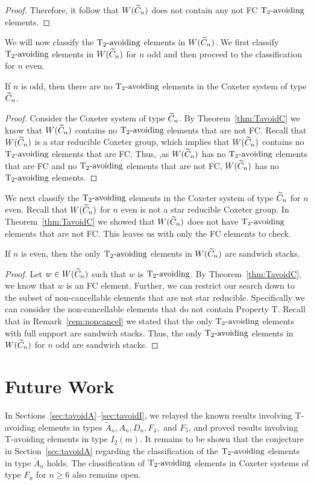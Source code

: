 \begin{theorem}
\begin{proof}
	Therefore, it follow that $W(\widetilde{C}_n)$ does not contain any not FC $\operatorname{T_2-\mathrm{avoiding}}$ elements. 
\end{proof}
\end{theorem}

We will now classify the $\operatorname{T_2-\mathrm{avoiding}}$ elements in $W(\widetilde{C}_n)$. We first classify $\operatorname{T_2-\mathrm{avoiding}}$ elements in $W(\widetilde{C}_n)$ for $n$ odd and then proceed to the classification for $n$ even.

\begin{theorem}
	If $n$ is odd, then there are no $\operatorname{T_2-\mathrm{avoiding}}$ elements in the Coxeter system of type $\widetilde{C}_n$.
	\begin{proof}
		Consider the Coxeter system of type $\widetilde{C}_n$. By Theorem~\ref{thm:TavoidC} we know that $W(\widetilde{C}_n)$ contains no $\operatorname{T_2-\mathrm{avoiding}}$ elements that are not FC. Recall that $W(\widetilde{C}_n)$ is a star reducible Coxeter group, which implies that $W(\widetilde{C}_n)$ contains no $\operatorname{T_2-\mathrm{avoiding}}$ elements that are FC. Thus, ,as $W(\widetilde{C}_n)$ has no $\operatorname{T_2-\mathrm{avoiding}}$ elements that are FC and no $\operatorname{T_2-\mathrm{avoiding}}$ elements that are not FC, $W(\widetilde{C}_n)$ has no $\operatorname{T_2-\mathrm{avoiding}}$ elements.
	\end{proof}
\end{theorem}

We next classify the $\operatorname{T_2-\mathrm{avoiding}}$ elements in the Coxeter system of type $\widetilde{C}_n$ for $n$ even. Recall that $W(\widetilde{C}_n)$ for $n$ even is not a star reducible Coxeter group. In Theorem~\ref{thm:TavoidC} we showed that $W(\widetilde{C}_n)$ does not have $\operatorname{T_2-\mathrm{avoiding}}$ elements that are not FC. This leaves us with only the FC elements to check.

\begin{theorem}
	If $n$ is even, then the only $\operatorname{T_2-\mathrm{avoiding}}$ elements in $W(\widetilde{C}_n)$ are sandwich stacks.
	\begin{proof}
		Let $w \in W(\widetilde{C}_n)$ such that $w$ is $\operatorname{T_2-\mathrm{avoiding}}$. By Theorem~\ref{thm:TavoidC}, we know that $w$ is an FC element. Further, we can restrict our search down to the subset of non-cancellable elements that are not star reducible. Specifically we can consider the non-cancellable elements that do not contain Property T. Recall that in Remark~\ref{rem:noncancel} we stated that the only $\operatorname{T_2-\mathrm{avoiding}}$ elements with full support are sandwich stacks. Thus, the only $\operatorname{T_2-\mathrm{avoiding}}$ elements in $W(\widetilde{C}_n)$ for $n$ odd are sandwich stacks.
	\end{proof}
\end{theorem}


\section{Future Work}\label{sec:open}
In Sections~\ref{sec:tavoidA}--\ref{sec:tavoidI}, we relayed the known results involving T-avoiding elements in types $\widetilde{A}_n, A_n, D_n, F_4,$ and $F_5$, and proved results involving T-avoiding elements in type $I_2(m)$. It remains to be shown that the conjecture in Section~\ref{sec:tavoidA} regarding the classification of the $\operatorname{T_2-\mathrm{avoiding}}$ elements in type $\widetilde{A}_n$ holds. The classification of $\operatorname{T_2-\mathrm{avoiding}}$ elements in Coxeter systems of type $F_n$ for $n \geq 6$ also remains open.

